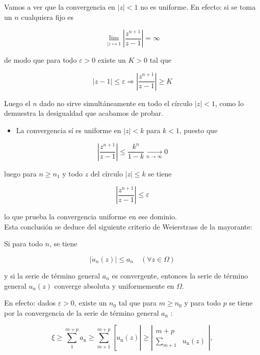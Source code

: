 \documentclass[10pt]{article}
\theoremstyle{plain}
\theoremstyle{definition}
\theoremstyle{remark}
\begin{document}
Vamos a ver que la convergencia en $|z|<1$ no es uniforme. En efecto: si se toma un $n$ cualquiera fijo es

$$
\lim _{\mid z \mapsto 1}\left|\frac{z^{n+1}}{z-1}\right|=\infty
$$

de modo que para toḍo $\varepsilon>0$ existe un $K>0$ tal que

$$
|z-1| \leqslant \varepsilon \Rightarrow\left|\frac{z^{n+1}}{z-1}\right| \geqslant K
$$

Luego el $n$ dado no sirve simultáneamente en todo el círculo $|z|<1$, como lo demuestra la desigualdad que acabamos de probar.

\begin{itemize}
  \item La convergencia sí es uniforme en $|z|<k$ para $k<1$, puesto que
\end{itemize}

$$
\left|\frac{z^{n+1}}{z-1}\right| \leqslant \frac{k^{n}}{1-k} \xrightarrow[n \rightarrow \infty]{ } 0
$$

luego para $n \geqslant n_{1}$ y todo $z$ del círculo $|z| \leqslant k$ se tiene

$$
\left|\frac{z^{n+1}}{z-1}\right| \leqslant \varepsilon
$$

lo que prueba la convergencia uniforme en ese dominio.\\
Esta conclusión se deduce del siguiente criterio de Weierstrass de la mayorante:

Si para todo $n$, se tiene


\begin{equation*}
\left|\dot{u}_{n}(z)\right| \leqslant a_{n} \quad(\forall z \in \Omega) \tag{$\forall z\in\Omega$}
\end{equation*}


y si la serie de término general $a_{n}$ es convergente, entonces la serie de término general $u_{n}(z)$ converge absoluta y uniformemente en $\Omega$.

En efecto: dados $\varepsilon>0$, existe un $n_{0}$ tal que para $m \geqslant n_{0}$ y para todo $p$ se tiene por la convergencia de la serie de término general $a_{\mathrm{n}}$ :

$$
\xi \geqslant \sum_{1}^{m+p} a_{\mathrm{n}} \geqslant \sum_{m+1}^{m+p}\left[u _ { \mathrm { n } } ( z ) \left|\geqslant\left|\begin{array}{cc}
m+p & \\
\sum_{m+1} & u_{\mathrm{n}}(z)
\end{array}\right|,\right.\right.
$$
\end{document}
